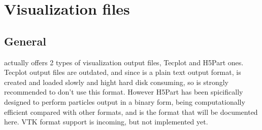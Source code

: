 \section{Visualization files}
\label{ss:running:visualizationoutput}
%
\subsection{General}
%
\NAME actually offers 2 types of visualization output files, Tecplot and H5Part
ones. Tecplot output files are outdated, and since is a plain text output format,
is created and loaded slowly and hight hard disk consuming, so is strongly
recommended to don't use this format. However H5Part has been spicifically designed
to perform particles output in a binary form, being computationally efficient
compared with other formats, and is the format that will be documented here.
%
\NAME VTK format support is incoming, but not implemented yet.
%
